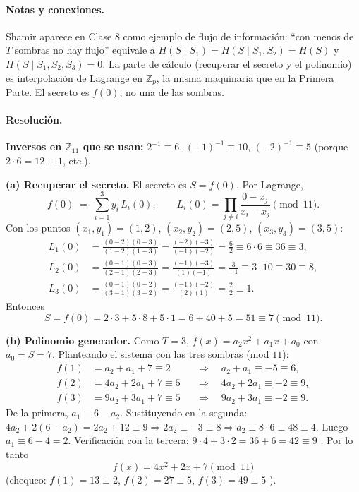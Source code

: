 \paragraph{Notas y conexiones.}
Shamir aparece en Clase 8 como ejemplo de flujo de información: ``con menos de $T$ sombras
no hay flujo'' equivale a $H(S\mid S_1)=H(S\mid S_1,S_2)=H(S)$ y $H(S\mid S_1,S_2,S_3)=0$.
La parte de cálculo (recuperar el secreto y el polinomio) es interpolación de Lagrange en
$\mathbb{Z}_p$, la misma maquinaria que en la Primera Parte. El secreto es $f(0)$, no una de
las sombras.

\paragraph{Resolución.}
\textbf{Inversos en $\mathbb{Z}_{11}$ que se usan:} $2^{-1}\equiv 6$, $(-1)^{-1}\equiv 10$,
$(-2)^{-1}\equiv 5$ (porque $2\cdot 6=12\equiv 1$, etc.).

\medskip
\textbf{(a) Recuperar el secreto.} El secreto es $S=f(0)$. Por Lagrange,
\begin{equation*}
  f(0) \;=\; \sum_{i=1}^{3} y_i \, L_i(0), \qquad
  L_i(0) = \prod_{j\neq i} \frac{0-x_j}{x_i-x_j} \pmod{11}.
\end{equation*}
Con los puntos $(x_1,y_1)=(1,2)$, $(x_2,y_2)=(2,5)$, $(x_3,y_3)=(3,5)$:
\begin{align*}
  L_1(0) &= \frac{(0-2)(0-3)}{(1-2)(1-3)} = \frac{(-2)(-3)}{(-1)(-2)} = \frac{6}{2} \equiv 6\cdot 6 \equiv 36 \equiv 3, \\
  L_2(0) &= \frac{(0-1)(0-3)}{(2-1)(2-3)} = \frac{(-1)(-3)}{(1)(-1)} = \frac{3}{-1} \equiv 3\cdot 10 \equiv 30 \equiv 8, \\
  L_3(0) &= \frac{(0-1)(0-2)}{(3-1)(3-2)} = \frac{(-1)(-2)}{(2)(1)} = \frac{2}{2} \equiv 1.
\end{align*}
Entonces
\begin{equation*}
  S = f(0) = 2\cdot 3 + 5\cdot 8 + 5\cdot 1 = 6 + 40 + 5 = 51 \equiv \boxed{7} \pmod{11}.
\end{equation*}

\medskip
\textbf{(b) Polinomio generador.} Como $T=3$, $f(x)=a_2 x^2 + a_1 x + a_0$ con $a_0=S=7$.
Planteando el sistema con las tres sombras (mod $11$):
\begin{align*}
  f(1) &= a_2 + a_1 + 7 \equiv 2 &&\Rightarrow\quad a_2 + a_1 \equiv -5 \equiv 6, \\
  f(2) &= 4a_2 + 2a_1 + 7 \equiv 5 &&\Rightarrow\quad 4a_2 + 2a_1 \equiv -2 \equiv 9, \\
  f(3) &= 9a_2 + 3a_1 + 7 \equiv 5 &&\Rightarrow\quad 9a_2 + 3a_1 \equiv -2 \equiv 9.
\end{align*}
De la primera, $a_1 \equiv 6 - a_2$. Sustituyendo en la segunda:
$4a_2 + 2(6-a_2) = 2a_2 + 12 \equiv 9 \Rightarrow 2a_2 \equiv -3 \equiv 8 \Rightarrow
a_2 \equiv 8\cdot 6 \equiv 48 \equiv 4$. Luego $a_1 \equiv 6-4 = 2$. Verificación con la
tercera: $9\cdot 4 + 3\cdot 2 = 36+6=42 \equiv 9$ \checkmark. Por lo tanto
\begin{equation*}
  \boxed{\,f(x) = 4x^2 + 2x + 7 \pmod{11}\,}
\end{equation*}
(chequeo: $f(1)=13\equiv 2$, $f(2)=27\equiv 5$, $f(3)=49\equiv 5$ \checkmark).


